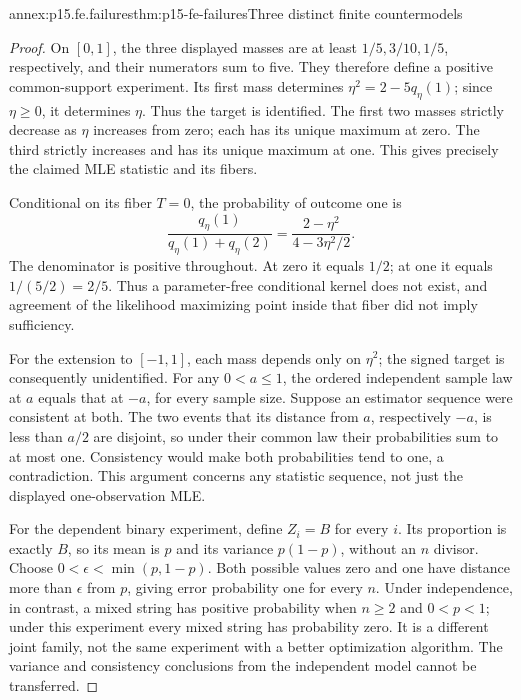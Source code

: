 \begin{annexitem}{annex:p15.fe.failures}{thm:p15-fe-failures}{Three distinct finite countermodels}
\begin{proof}
On \([0,1]\), the three displayed masses are at least
\(1/5,3/10,1/5\), respectively, and their numerators sum to five.
They therefore define a positive common-support experiment.
Its first mass determines \(\eta^2=2-5q_\eta(1)\); since
\(\eta\geq0\), it determines \(\eta\). Thus the target is identified.
The first two masses strictly decrease as \(\eta\) increases from
zero; each has its unique maximum at zero. The third strictly increases
and has its unique maximum at one. This gives precisely the claimed
MLE statistic and its fibers.

Conditional on its fiber \(T=0\), the probability of outcome one is
\[
 \frac{q_\eta(1)}{q_\eta(1)+q_\eta(2)}
                =\frac{2-\eta^2}{4-3\eta^2/2}.
\]
The denominator is positive throughout. At zero it equals \(1/2\);
at one it equals \(1/(5/2)=2/5\). Thus a parameter-free conditional
kernel does not exist, and agreement of the likelihood maximizing point
inside that fiber did not imply sufficiency.

For the extension to \([-1,1]\), each mass depends only on
\(\eta^2\); the signed target is consequently unidentified.
For any \(0<a\leq1\), the ordered independent sample law at \(a\)
equals that at \(-a\), for every sample size. Suppose an estimator
sequence were consistent at both. The two events that its distance
from \(a\), respectively \(-a\), is less than \(a/2\) are
disjoint, so under their common law their probabilities sum to at most
one. Consistency would make both probabilities tend to one, a
contradiction. This argument concerns any statistic sequence, not just
the displayed one-observation MLE.

For the dependent binary experiment, define \(Z_i=B\) for every
\(i\). Its proportion is exactly \(B\), so its mean is \(p\)
and its variance \(p(1-p)\), without an \(n\) divisor.
Choose \(0<\epsilon<\min(p,1-p)\). Both possible values zero and
one have distance more than \(\epsilon\) from \(p\), giving
error probability one for every \(n\). Under independence, in
contrast, a mixed string has positive probability when \(n\geq2\)
and \(0<p<1\); under this experiment every mixed string has
probability zero. It is a different joint family, not the same
experiment with a better optimization algorithm. The variance and
consistency conclusions from the independent model cannot be transferred.
\end{proof}
\end{annexitem}

